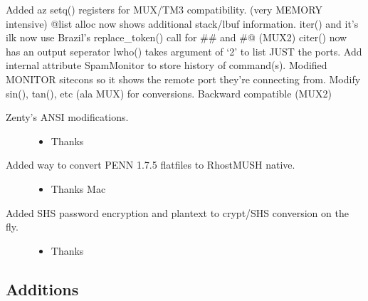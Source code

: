 \documentclass[letterpaper,10pt,english]{sphinxmanual}
\begin{document}
\sphinxAtStartPar
Added a\sphinxhyphen{}z setq() registers for MUX/TM3 compatibility. (very MEMORY intensive)
@list alloc now shows additional stack/lbuf information.
iter() and it’s ilk now use Brazil’s replace\_token() call for \#\# and \#@ (MUX2)
citer() now has an output seperator
lwho() takes argument of ‘2’ to list JUST the ports.
Add internal attribute SpamMonitor to store history of command(s).
Modified MONITOR sitecons so it shows the remote port they’re connecting from.
Modify sin(), tan(), etc (ala MUX) for conversions.  Backward compatible (MUX2)
\begin{description}
\item[{Zenty’s ANSI modifications.}] \leavevmode\begin{itemize}
\item {} 
\sphinxAtStartPar
Thanks 

\end{itemize}

\item[{Added way to convert PENN 1.7.5 flatfiles to RhostMUSH native.}] \leavevmode\begin{itemize}
\item {} 
\sphinxAtStartPar
Thanks Mac

\end{itemize}

\item[{Added SHS password encryption and plantext to crypt/SHS conversion on the fly.}] \leavevmode\begin{itemize}
\item {} 
\sphinxAtStartPar
Thanks 

\end{itemize}

\end{description}


\subsection{Additions}
\label{\detokenize{changelog:id19}}
\end{document}
